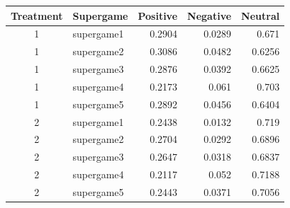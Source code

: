 \begin{tabular}{clrrr}
  \toprule
  Treatment & Supergame & Positive & Negative & Neutral \\ 
  \midrule
  1 & supergame1 & 0.2904 & 0.0289 & 0.671 \\ 
  1 & supergame2 & 0.3086 & 0.0482 & 0.6256 \\ 
  1 & supergame3 & 0.2876 & 0.0392 & 0.6625 \\ 
  1 & supergame4 & 0.2173 & 0.061 & 0.703 \\ 
  1 & supergame5 & 0.2892 & 0.0456 & 0.6404 \\ 
  2 & supergame1 & 0.2438 & 0.0132 & 0.719 \\ 
  2 & supergame2 & 0.2704 & 0.0292 & 0.6896 \\ 
  2 & supergame3 & 0.2647 & 0.0318 & 0.6837 \\ 
  2 & supergame4 & 0.2117 & 0.052 & 0.7188 \\ 
  2 & supergame5 & 0.2443 & 0.0371 & 0.7056 \\ 
  \bottomrule
\end{tabular}
